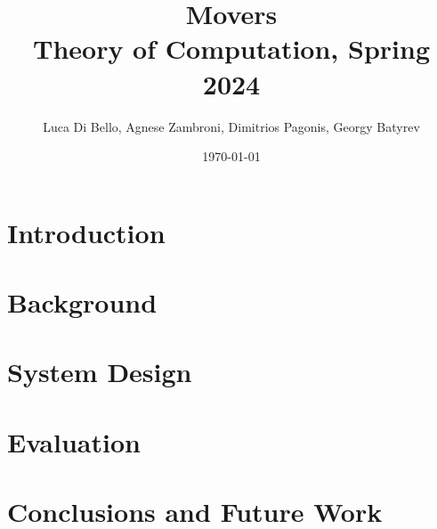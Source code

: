 \documentclass[a4paper, 11pt]{article}
\title{Movers \\[1ex] \large Theory of Computation, Spring 2024}
\author{Luca Di Bello, Agnese Zambroni, Dimitrios Pagonis, Georgy Batyrev}
\date{\today}
\begin{document}
\maketitle
\tableofcontents

\section{Introduction}

\pagebreak

\section{Background}

\pagebreak

\section{System Design}

\pagebreak

\section{Evaluation}

\pagebreak

\section{Conclusions and Future Work}


\end{document}
